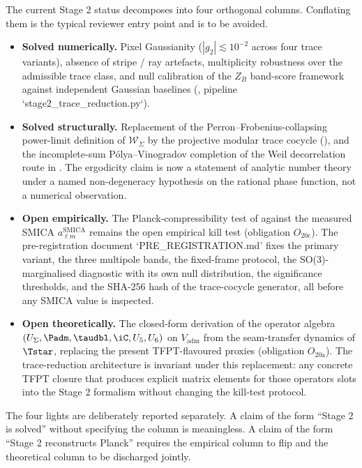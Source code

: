 \begin{remark}
\label{rem:stage2-traffic-light}
The current Stage 2 status decomposes into four orthogonal columns. Conflating them is the
typical reviewer entry point and is to be avoided.
\begin{itemize}[leftmargin=2.0em,topsep=3pt,itemsep=2pt]
\item \textbf{Solved numerically.} Pixel Gaussianity ($|g_2|\lesssim 10^{-2}$ across four
trace variants), absence of stripe / ray artefacts, multiplicity robustness over the
admissible trace class, and null calibration of the $Z_B$ band-score framework against
independent Gaussian baselines (, pipeline
`stage2\_trace\_reduction.py`).
\item \textbf{Solved structurally.} Replacement of the Perron--Frobenius-collapsing power-limit
definition of $\mathcal W_\Sigma$ by the projective modular trace cocycle
(), and the incomplete-sum P\'olya--Vinogradov
completion of the Weil decorrelation route in . The
ergodicity claim is now a statement of analytic number theory under a named
non-degeneracy hypothesis on the rational phase function, not a numerical observation.
\item \textbf{Open empirically.} The Planck-compressibility test of
 against the measured SMICA $a_{\ell m}^{\mathrm{SMICA}}$
remains the open empirical kill test (obligation $O_{20\mathrm{c}}$). The pre-registration
document `PRE\_REGISTRATION.md' fixes the primary variant, the three multipole bands, the
fixed-frame protocol, the SO(3)-marginalised diagnostic with its own null distribution, the
significance thresholds, and the SHA-256 hash of the trace-cocycle generator, all before any
SMICA value is inspected.
\item \textbf{Open theoretically.} The closed-form derivation of the operator algebra
$(U_\Sigma,\Padm,\taudbl,\iC,U_5,U_6)$ on $V_{\mathrm{adm}}$ from the seam-transfer dynamics
of $\Tstar$, replacing the present TFPT-flavoured proxies (obligation $O_{20\mathrm{a}}$).
The trace-reduction architecture is invariant under this replacement: any concrete TFPT
closure that produces explicit matrix elements for those operators slots into the Stage 2
formalism without changing the kill-test protocol.
\end{itemize}
The four lights are deliberately reported separately. A claim of the form ``Stage 2 is
solved'' without specifying the column is meaningless. A claim of the form
``Stage 2 reconstructs Planck'' requires the empirical column to flip and the theoretical
column to be discharged jointly.
\end{remark}

